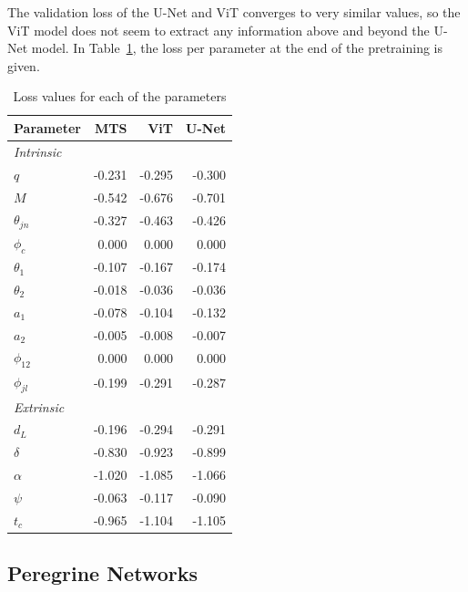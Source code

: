 The validation loss of the U-Net and ViT converges to very similar values, so the ViT model does not seem to extract any information above and beyond the U-Net model. In Table~\ref{tab:loss_pretraining}, the loss per parameter at the end of the pretraining is given. 

\begin{table}[htb]
    \caption{Loss values for each of the parameters}
    \label{tab:loss_pretraining}
    \begin{tabular}{lrrr}
    \toprule
    Parameter & MTS & ViT & U-Net \\
    \midrule
    \textit{Intrinsic} &&& \\
    $q$ & -0.231 & -0.295 & -0.300 \\
    $M$ & -0.542 & -0.676 & -0.701 \\
    $\theta_{jn}$ & -0.327 & -0.463 & -0.426 \\
    $\phi_c$ & 0.000 & 0.000 & 0.000 \\
    $\theta_1$ & -0.107 & -0.167 & -0.174 \\
    $\theta_2$ & -0.018 & -0.036 & -0.036 \\
    $a_1$ & -0.078 & -0.104 & -0.132 \\
    $a_2$ & -0.005 & -0.008 & -0.007 \\
    $\phi_{12}$ & 0.000 & 0.000 & 0.000 \\
    $\phi_{jl}$ & -0.199 & -0.291 & -0.287 \\
    \midrule
    \textit{Extrinsic} &&& \\
    $d_L$ & -0.196 & -0.294 & -0.291 \\
    $\delta$ & -0.830 & -0.923 & -0.899 \\
    $\alpha$ & -1.020 & -1.085 & -1.066 \\
    $\psi$ & -0.063 & -0.117 & -0.090 \\
    $t_c$ & -0.965 & -1.104 & -1.105 \\
    \bottomrule
    \end{tabular}
\end{table}

\subsection{Peregrine Networks}

